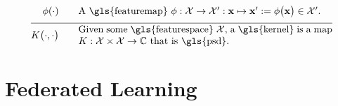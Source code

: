 \begin{align}
	\featuremap(\cdot)  \quad\quad & \parbox{.75\textwidth}{A \gls{featuremap} $\featuremap: \featurespace \rightarrow \featurespace' : \featurevec \mapsto \featurevec' \defeq \featuremap\big( \featurevec \big) \in \featurespace'$.}   \nonumber \\[2mm] \hline \nonumber\\[-5mm]
	\kernelmap{\cdot}{\cdot} \quad\quad & \parbox{.75\textwidth}{Given some \gls{featurespace} $\featurespace$, 
		a \gls{kernel} is a map $\kernel: \featurespace \times \featurespace \rightarrow \mathbb{C}$ that is \gls{psd}.}    \nonumber                                                                                                                                                     
\end{align}              






\newpage
\section*{Federated Learning}

